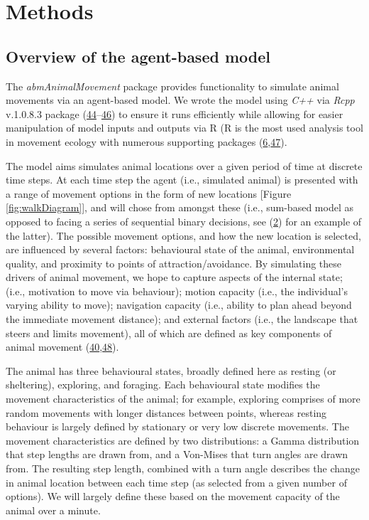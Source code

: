 \documentclass[10pt,a4paper]{article}
\begin{document}
\hypertarget{methods}{%
\section{Methods}\label{methods}}

\hypertarget{overview-of-the-agent-based-model}{%
\subsection{Overview of the agent-based model}\label{overview-of-the-agent-based-model}}

The \emph{abmAnimalMovement} package provides functionality to simulate animal movements via an agent-based model.
We wrote the model using \emph{C++} via \emph{Rcpp} v.1.0.8.3 package (\protect\hyperlink{ref-Eddelbuettel_seamless_2011}{44}--\protect\hyperlink{ref-Eddelbuettel_extending_2018}{46}) to ensure it runs efficiently while allowing for easier manipulation of model inputs and outputs via R (R is the most used analysis tool in movement ecology with numerous supporting packages (\protect\hyperlink{ref-joo_recent_2022}{6},\protect\hyperlink{ref-joo_navigating_2020}{47}).

The model aims simulates animal locations over a given period of time at discrete time steps.
At each time step the agent (i.e., simulated animal) is presented with a range of movement options in the form of new locations {[}Figure \ref{fig:walkDiagram}{]}, and will chose from amongst these (i.e., sum-based model as opposed to facing a series of sequential binary decisions, see (\protect\hyperlink{ref-sridhar_geometry_2021}{2}) for an example of the latter).
The possible movement options, and how the new location is selected, are influenced by several factors: behavioural state of the animal, environmental quality, and proximity to points of attraction/avoidance.
By simulating these drivers of animal movement, we hope to capture aspects of the internal state; (i.e., motivation to move via behaviour); motion capacity (i.e., the individual's varying ability to move); navigation capacity (i.e., ability to plan ahead beyond the immediate movement distance); and external factors (i.e., the landscape that steers and limits movement), all of which are defined as key components of animal movement (\protect\hyperlink{ref-Tang2010}{40},\protect\hyperlink{ref-Nathan2008}{48}).

The animal has three behavioural states, broadly defined here as resting (or sheltering), exploring, and foraging.
Each behavioural state modifies the movement characteristics of the animal; for example, exploring comprises of more random movements with longer distances between points, whereas resting behaviour is largely defined by stationary or very low discrete movements.
The movement characteristics are defined by two distributions: a Gamma distribution that step lengths are drawn from, and a Von-Mises that turn angles are drawn from.
The resulting step length, combined with a turn angle describes the change in animal location between each time step (as selected from a given number of options).
We will largely define these based on the movement capacity of the animal over a minute.
\end{document}
